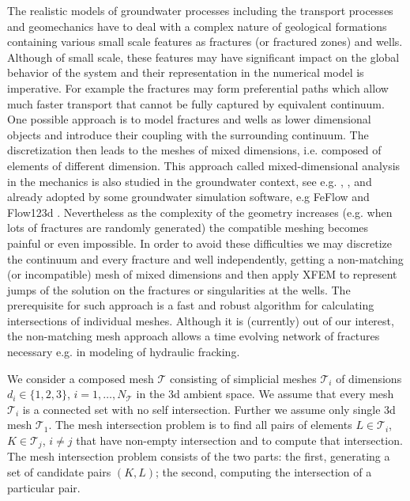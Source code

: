 The realistic models of groundwater processes including the transport processes and geomechanics have to deal with 
a complex nature of geological formations containing various small scale features as fractures (or fractured zones) and wells. 
Although of small scale, these features may have significant impact 
on the global behavior of the system and their representation in the numerical model is imperative. For example the fractures may form preferential 
paths which allow much faster transport that cannot be fully captured by equivalent continuum.
One possible approach is to model fractures and wells as lower dimensional objects and introduce their coupling with the surrounding continuum. 
The discretization then leads to the meshes of mixed dimensions, i.e. composed of elements of different dimension. This approach 
called mixed-dimensional analysis in the mechanics \cite{bournival_mesh-geometry_2008} is also studied in the groundwater context, see e.g. 
\cite{martin_modeling_2005}, \cite{fumagalli_numerical_2011}, \cite{brezina_analysis_2015} and 
already adopted by some groundwater simulation software, e.g FeFlow \cite{trefry_feflow_2007} and Flow123d \cite{flow123d}.
Nevertheless as the complexity of the geometry increases (e.g. when lots of fractures are randomly generated) the compatible meshing becomes painful or even 
impossible. In order to avoid these difficulties we may discretize the continuum and every fracture and well independently, getting a non-matching 
(or incompatible) mesh of mixed dimensions and then apply XFEM to represent jumps of the solution on the fractures or singularities 
at the wells. The prerequisite for such approach is a fast and robust algorithm for calculating intersections of individual meshes.
Although it is (currently) out of our interest, the non-matching mesh approach allows a time evolving network of fractures necessary e.g. in 
modeling of hydraulic fracking.

We consider a composed mesh $\mathcal T$ consisting of simplicial meshes $\mathcal T_i$ of dimensions $d_i \in \{1,2,3\}$, $i=1,\dots,N_\mathcal{T}$
in the 3d ambient space. We assume that every mesh $\mathcal T_i$ is a connected set with no self intersection.
Further we assume only single 3d mesh $\mathcal{T}_1$.
The mesh intersection problem is to find all pairs of elements $L\in \mathcal{T}_i$, $K\in \mathcal{T}_j$, $i\ne j$ that have non-empty intersection 
and to compute that intersection. The mesh intersection problem consists of the two parts: the first, generating a set of candidate pairs $(K, L)$;
the second, computing the intersection of a particular pair.


